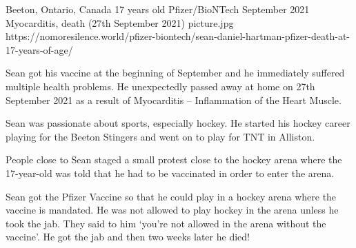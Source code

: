 {Beeton, Ontario, Canada}
{17 years old}
{Pfizer/BioNTech}
{September 2021}
{Myocarditis, death (27th September 2021)}
{picture.jpg}
{https://nomoresilence.world/pfizer-biontech/sean-daniel-hartman-pfizer-death-at-17-years-of-age/}
{

Sean got his vaccine at the beginning of September and he immediately suffered
multiple health problems. He unexpectedly passed away at home on 27th September
2021 as a result of Myocarditis – Inflammation of the Heart Muscle.

Sean was passionate about sports, especially hockey. He started his hockey
career playing for the Beeton Stingers and went on to play for TNT in Alliston.

People close to Sean staged a small protest close to the hockey arena where the
17-year-old was told that he had to be vaccinated in order to enter the arena.

Sean got the Pfizer Vaccine so that he could play in a hockey arena where the
vaccine is mandated. He was not allowed to play hockey in the arena unless he
took the jab. They said to him ‘you’re not allowed in the arena without the
vaccine’. He got the jab and then two weeks later he died!

}
